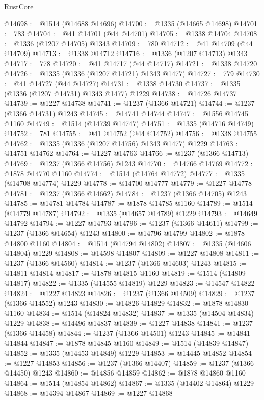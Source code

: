 \begin{lexlean}{RustCore}
\begin{coremodule}
@14698 := @1514 (@14688 @14696)
@14700 := @1335 (@14665 @14698)
@14701 := 783
@14704 := @41 @14701 (@44 @14701)
@14705 := @1338 @14704
@14708 := @1336 (@1207 @14705) @1343
@14709 := 780
@14712 := @41 @14709 (@44 @14709)
@14713 := @1338 @14712
@14716 := @1336 (@1207 @14713) @1343
@14717 := 778
@14720 := @41 @14717 (@44 @14717)
@14721 := @1338 @14720
@14726 := @1335 (@1336 (@1207 @14721) @1343 @1477)
@14727 := 779
@14730 := @41 @14727 (@44 @14727)
@14731 := @1338 @14730
@14737 := @1335 (@1336 (@1207 @14731) @1343 @1477) @1229
@14738 := @14726 @14737
@14739 := @1227 @14738
@14741 := @1237 (@1366 @14721)
@14744 := @1237 (@1366 @14731) @1243
@14745 := @14741 @14744
@14747 := @1556 @14745 @1160
@14749 := @1514 (@14739 @14747)
@14751 := @1335 (@14716 @14749)
@14752 := 781
@14755 := @41 @14752 (@44 @14752)
@14756 := @1338 @14755
@14762 := @1335 (@1336 (@1207 @14756) @1343 @1477) @1229
@14763 := @14751 @14762
@14764 := @1227 @14763
@14766 := @1237 (@1366 @14713)
@14769 := @1237 (@1366 @14756) @1243
@14770 := @14766 @14769
@14772 := @1878 @14770 @1160
@14774 := @1514 (@14764 @14772)
@14777 := @1335 (@14708 @14774) @1229
@14778 := @14700 @14777
@14779 := @1227 @14778
@14781 := @1237 (@1366 @14662)
@14784 := @1237 (@1366 @14705) @1243
@14785 := @14781 @14784
@14787 := @1878 @14785 @1160
@14789 := @1514 (@14779 @14787)
@14792 := @1335 (@14657 @14789) @1229
@14793 := @14649 @14792
@14794 := @1227 @14793
@14796 := @1237 (@1366 @14611)
@14799 := @1237 (@1366 @14654) @1243
@14800 := @14796 @14799
@14802 := @1878 @14800 @1160
@14804 := @1514 (@14794 @14802)
@14807 := @1335 (@14606 @14804) @1229
@14808 := @14598 @14807
@14809 := @1227 @14808
@14811 := @1237 (@1366 @14560)
@14814 := @1237 (@1366 @14603) @1243
@14815 := @14811 @14814
@14817 := @1878 @14815 @1160
@14819 := @1514 (@14809 @14817)
@14822 := @1335 (@14555 @14819) @1229
@14823 := @14547 @14822
@14824 := @1227 @14823
@14826 := @1237 (@1366 @14509)
@14829 := @1237 (@1366 @14552) @1243
@14830 := @14826 @14829
@14832 := @1878 @14830 @1160
@14834 := @1514 (@14824 @14832)
@14837 := @1335 (@14504 @14834) @1229
@14838 := @14496 @14837
@14839 := @1227 @14838
@14841 := @1237 (@1366 @14458)
@14844 := @1237 (@1366 @14501) @1243
@14845 := @14841 @14844
@14847 := @1878 @14845 @1160
@14849 := @1514 (@14839 @14847)
@14852 := @1335 (@14453 @14849) @1229
@14853 := @14445 @14852
@14854 := @1227 @14853
@14856 := @1237 (@1366 @14407)
@14859 := @1237 (@1366 @14450) @1243
@14860 := @14856 @14859
@14862 := @1878 @14860 @1160
@14864 := @1514 (@14854 @14862)
@14867 := @1335 (@14402 @14864) @1229
@14868 := @14394 @14867
@14869 := @1227 @14868

\end{coremodule}
\end{lexlean}
